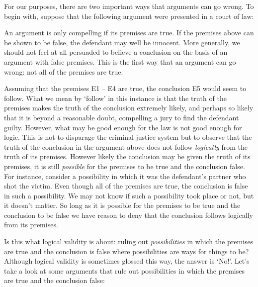 For our purposes, there are two important ways that arguments can go wrong.
To begin with, suppose that the following argument were presented in a court of law:

\begin{earg}
\end{earg}

An argument is only compelling if its premises are true.
If the premises above can be shown to be false, the defendant may well be innocent.
More generally, we should not feel at all persuaded to believe a conclusion on the basis of an argument with false premises. 
This is the first way that an argument can go wrong: not all of the premises are true.

Assuming that the premises E1 -- E4 are true, the conclusion E5 would seem to follow.
What we mean by `follow' in this instance is that the truth of the premises makes the truth of the conclusion extremely likely, and perhaps so likely that it is beyond a reasonable doubt, compelling a jury to find the defendant guilty.
However, what may be good enough for the law is not good enough for logic.
This is not to disparage the criminal justice system but to observe that the truth of the conclusion in the argument above does not follow \textit{logically} from the truth of its premises.
However likely the conclusion may be given the truth of its premises, it is still \textit{possible} for the premises to be true and the conclusion false.
For instance, consider a possibility in which it was the defendant's partner who shot the victim.
Even though all of the premises are true, the conclusion is false in such a possibility.
We may not know if such a possibility took place or not, but it doesn't matter.
So long as it is possible for the premises to be true and the conclusion to be false we have reason to deny that the conclusion follows logically from its premises.

Is this what logical validity is about: ruling out \textit{possibilities} in which the premises are true and the conclusion is false where possibilities are ways for things to be?
Although logical validity is sometimes glossed this way, the answer is `No!'.
Let's take a look at some arguments that rule out possibilities in which the premises are true and the conclusion false:

